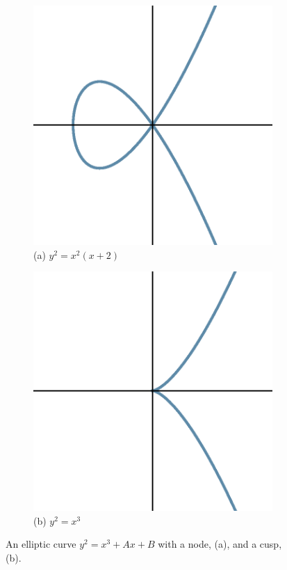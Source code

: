 	\begin{figure}[!ht]
	\centering
	\begin{subfigure}{0.35\textwidth}
	\includegraphics[width=\textwidth]{images/ec3.eps}
	\caption*{(a) $y^2=x^2(x+2)$}
	\end{subfigure}
	\begin{subfigure}{0.35\textwidth}
	\includegraphics[width=\textwidth]{images/ec4.eps}
	\caption*{(b) $y^2= x^3$}
	\end{subfigure}
	\caption{An elliptic curve $y^2= x^3 + Ax + B$ with a node, (a), and a cusp, (b).\label{fig:singelliptic}}
	\end{figure}


